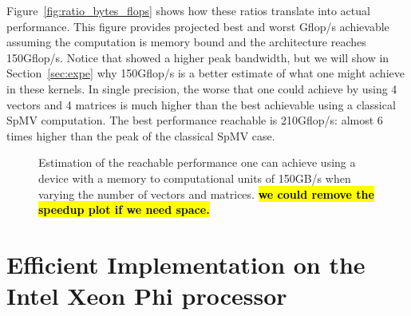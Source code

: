 \documentclass[10pt,conference,compsocconf]{IEEEtran}
\newcommand{\todo}[1]{{\color{red}\textbf{\hl{#1}}\xspace}}
\begin{document}
Figure~\ref{fig:ratio_bytes_flops} shows how these ratios translate
into actual performance. This figure provides projected best and worst
Gflop/s achievable assuming the computation is memory bound and the
architecture reaches 150Gflop/s. Notice that \cite{Saule13-ARXIV}
showed a higher peak bandwidth, but we will show in
Section~\ref{sec:expe} why 150Gflop/s is a better estimate of what one
might achieve in these kernels. In single precision, the worse that
one could achieve by using 4 vectors and 4 matrices is much higher
than the best achievable using a classical SpMV computation. The best
performance reachable is 210Gflop/s: almost 6 times higher than the
peak of the classical SpMV case. 


\begin{figure}
  \centering 
%
  
  \caption{Estimation of the reachable performance one can achieve
    using a device with a memory to computational units of 150GB/s
    when varying the number of vectors and matrices. \todo{we could
      remove the speedup plot if we need space.}}
  \label{fig:perf_predict}
\end{figure}

\section{Efficient Implementation on the Intel Xeon Phi processor}
\label{sec:impl}
\end{document}

